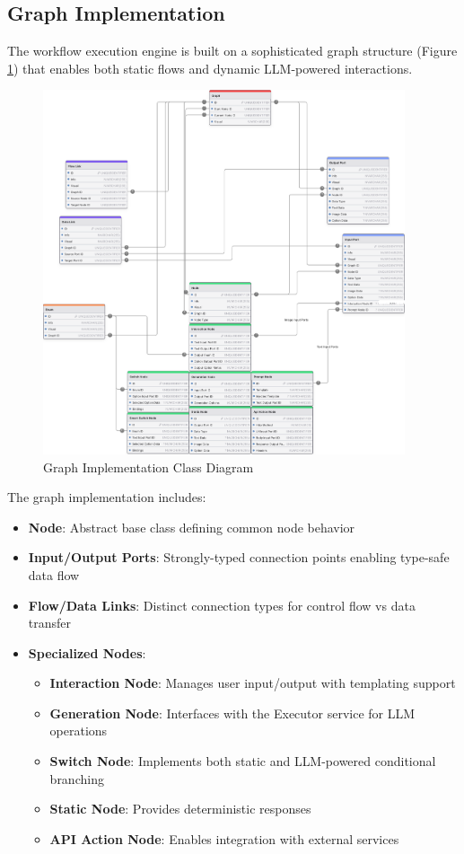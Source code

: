 \subsection{Graph Implementation}
The workflow execution engine is built on a sophisticated graph structure (Figure \ref{fig:graph_uml}) that enables both static flows and dynamic LLM-powered interactions.

\begin{figure}[H]
    \centering
    \includegraphics[width=0.95\textwidth]{assets/GraphUmlDiagram.png}
    \caption{Graph Implementation Class Diagram}
    \label{fig:graph_uml}
\end{figure}

The graph implementation includes:
\begin{itemize}
    \item \textbf{Node}: Abstract base class defining common node behavior
    \item \textbf{Input/Output Ports}: Strongly-typed connection points enabling type-safe data flow
    \item \textbf{Flow/Data Links}: Distinct connection types for control flow vs data transfer
    \item \textbf{Specialized Nodes}:
    \begin{itemize}
        \item \textbf{Interaction Node}: Manages user input/output with templating support
        \item \textbf{Generation Node}: Interfaces with the Executor service for LLM operations
        \item \textbf{Switch Node}: Implements both static and LLM-powered conditional branching
        \item \textbf{Static Node}: Provides deterministic responses
        \item \textbf{API Action Node}: Enables integration with external services
    \end{itemize}
\end{itemize}

